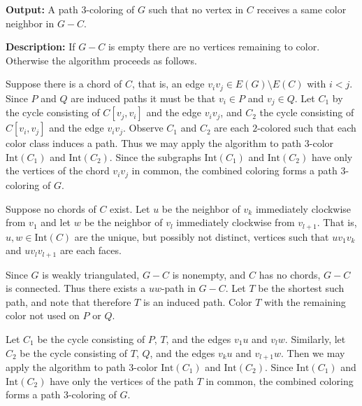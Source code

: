 \documentclass[letterpaper, 12pt]{amsart}
\theoremstyle{definition}
\theoremstyle{definition}
\theoremstyle{thm}
\theoremstyle{definition}
\begin{document}
\noindent\textbf{Output:} A path $3$-coloring of $G$ such that no vertex in
$C$ receives a same color neighbor in $G-C$.

\noindent\textbf{Description:} If $G-C$ is empty there are no vertices remaining
to color. Otherwise the algorithm proceeds as follows.

Suppose there is a chord of $C$, that is, an edge $v_iv_j\in E(G)\setminus E(C)$
with $i<j$. Since $P$ and $Q$ are induced paths it must be that $v_i\in P$ and
$v_j\in Q$. Let $C_1$ by the cycle consisting of $C[v_j,v_i]$ and the
edge $v_iv_j$, and $C_2$ the cycle consisting of $C[v_i,v_j]$ and the edge
$v_iv_j$. Observe $C_1$ and $C_2$ are each $2$-colored
such that each color class induces a path. Thus we may apply the algorithm to
path $3$-color $\text{Int}(C_1)$ and $\text{Int}(C_2)$. Since the subgraphs
$\text{Int}(C_1)$ and $\text{Int}(C_2)$ have only the vertices of the chord
$v_iv_j$ in common, the combined coloring forms a path $3$-coloring of $G$.

Suppose no chords of $C$ exist. Let $u$ be the neighbor of $v_k$ immediately
clockwise from $v_1$ and let $w$ be the neighbor of $v_l$ immediately clockwise
from $v_{l+1}$. That is, $u,w\in\text{Int}(C)$ are the unique, but possibly not
distinct, vertices such that $uv_1v_k$ and $uv_lv_{l+1}$ are each faces.

Since $G$ is weakly triangulated, $G-C$ is nonempty,
and $C$ has no chords, $G-C$ is connected. Thus there exists a $uw$-path in
$G-C$. Let $T$ be the shortest such path, and note that therefore $T$ is
an induced path. Color $T$ with the remaining color not used on $P$ or $Q$.

Let $C_1$ be the cycle
consisting of $P$, $T$, and the edges $v_1u$ and $v_lw$. Similarly, let $C_2$ be
the cycle consisting of $T$, $Q$, and the edges $v_ku$ and $v_{l+1}w$. Then we
may apply the algorithm to path $3$-color $\text{Int}(C_1)$ and
$\text{Int}(C_2)$. Since $\text{Int}(C_1)$ and $\text{Int}(C_2)$ have only the
vertices of the path $T$ in common, the combined coloring forms a path
$3$-coloring of $G$.\\
\end{document}
